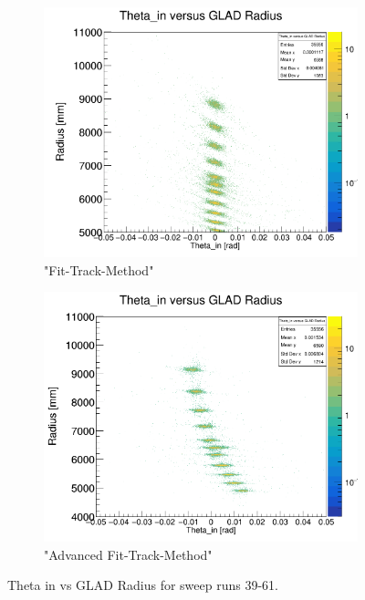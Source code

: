 \documentclass[12pt, letterpaper]{article}
\begin{document}
\begin{figure}[!htbp]
\begin{subfigure}{.5\textwidth}
\end{subfigure}
\begin{subfigure}{.5\textwidth}
  \centering
  \includegraphics[width=.9\linewidth]{plot_imgs/theta_in_rho_fit.png} 
  \caption{"Fit-Track-Method"}
  \label{fig:sub-second}
\end{subfigure}
\begin{subfigure}{.5\textwidth}
  \centering
  \includegraphics[width=.9\linewidth]{plot_imgs/theta_in_rho_last.png} 
  \caption{"Advanced Fit-Track-Method"}
  \label{fig:sub-second}
\end{subfigure}
\caption{Theta \textunderscore in vs GLAD Radius for sweep runs 39-61.}
\label{fig:fig}
\end{figure}
\FloatBarrier
\clearpage
\end{document}
